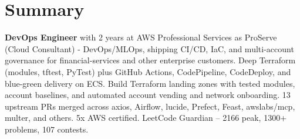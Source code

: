 \section{\textbf{Summary}}
\vspace{1pt}
\small{\textbf{DevOps Engineer} with 2 years at AWS Professional Services as ProServe (Cloud Consultant) - DevOps/MLOps, shipping CI/CD, IaC, and multi-account governance for financial-services and other enterprise customers. Deep Terraform (modules, tftest, PyTest) plus GitHub Actions, CodePipeline, CodeDeploy, and blue-green delivery on ECS. Build Terraform landing zones with tested modules, account baselines, and automated account vending and network onboarding. 13 upstream PRs merged across axios, Airflow, lucide, Prefect, Feast, awslabs/mcp, multer, and others. 5x AWS certified. LeetCode Guardian -- 2166 peak, 1300+ problems, 107 contests.}
\vspace{-2mm}
